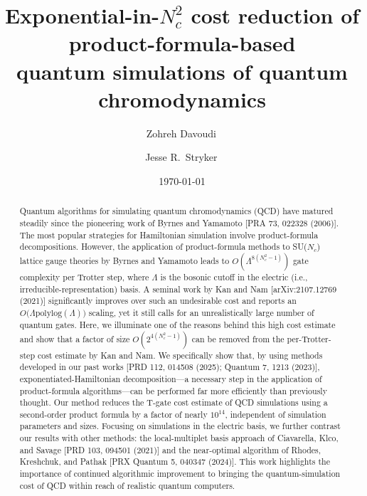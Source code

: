 \documentclass[aps,prd,twocolumn,showpacs,groupedaddress,superscriptaddress,nofootinbib,floatfix,preprintnumbers,longbibliography]{revtex4-1}
\begin{document}
\dimen{}\baselineskip\relax


\title{Exponential-in-$N_c^2$ cost reduction of product-formula-based
\\
quantum simulations of quantum chromodynamics
}

\author{Zohreh Davoudi\,}

\author{Jesse R.~Stryker\,}

\date{\today}

\begin{abstract}
Quantum algorithms for simulating quantum chromodynamics (QCD) have matured steadily since the pioneering work of Byrnes and Yamamoto [PRA 73, 022328 (2006)]. The most popular strategies for Hamiltonian simulation involve product-formula decompositions. However, the application of product-formula methods to SU($N_c$) lattice gauge theories by Byrnes and Yamamoto leads to $O(\Lambda^{8(N_c^2-1)})$ gate complexity per Trotter step, where $\Lambda$ is the bosonic cutoff in the electric (i.e., irreducible-representation) basis. A seminal work by Kan and Nam [arXiv:2107.12769 (2021)] significantly improves over such an undesirable cost and reports an $O\big(\Lambda \text{polylog}(\Lambda)\big)$ scaling, yet it still calls for an unrealistically large number of quantum gates. Here, we illuminate one of the reasons behind this high cost estimate and show that a factor of size $O(2^{4(N_c^2-1)})$ can be removed from the per-Trotter-step cost estimate by Kan and Nam. We specifically show that, by using methods developed in our past works [PRD 112, 014508 (2025); Quantum 7, 1213 (2023)], exponentiated-Hamiltonian decomposition---a necessary step in the application of product-formula algorithms---can be performed far more efficiently than previously thought. Our method reduces the T-gate cost estimate of QCD simulations using a second-order product formula by a factor of nearly $10^{14}$, independent of simulation parameters and sizes. Focusing on simulations in the electric basis, we further contrast our results with other methods: the local-multiplet basis approach of Ciavarella, Klco, and Savage [PRD 103, 094501 (2021)] and the near-optimal algorithm of Rhodes, Kreshchuk, and Pathak [PRX Quantum 5, 040347 (2024)]. This work highlights the importance of continued algorithmic improvement to bringing the quantum-simulation cost of QCD within reach of realistic quantum computers.
\end{abstract}
\end{document}

